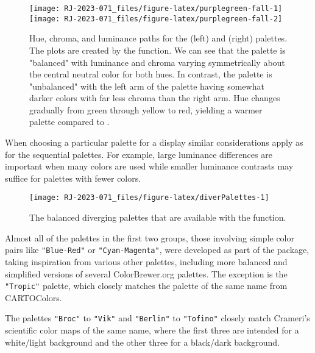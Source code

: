 \begin{figure}[ht!]

{\centering \texttt{[image: RJ-2023-071\_files/figure-latex/purplegreen-fall-1]} \texttt{[image: RJ-2023-071\_files/figure-latex/purplegreen-fall-2]} 

}

\caption{Hue, chroma, and luminance paths for the  (left) and  (right) palettes. The plots are created by the  function. We can see that the  palette is "balanced" with luminance and chroma varying symmetrically about the central neutral color for both hues. In contrast, the  palette is "unbalanced" with the left arm of the palette having somewhat darker colors with far less chroma than the right arm. Hue changes gradually from green through yellow to red, yielding a warmer palette compared to .}\label{fig:purplegreen-fall}
\end{figure}

When choosing a particular palette for a display similar
considerations apply as for the sequential palettes. For example,
large luminance differences are important when many colors are used
while smaller luminance contrasts may suffice for palettes with fewer
colors.

\begin{figure}[ht!]

{\centering \texttt{[image: RJ-2023-071\_files/figure-latex/diverPalettes-1]} 

}

\caption{The balanced diverging palettes that are available with the  function.}\label{fig:diverPalettes}
\end{figure}

Almost all of the palettes in the first two groups, those
involving simple color pairs like
\texttt{"Blue-Red"} or \texttt{"Cyan-Magenta"}, were developed as part of the
 package, taking inspiration
from various other palettes, including more balanced and simplified
versions of several ColorBrewer.org palettes.
The exception is the \texttt{"Tropic"} palette,
which closely matches the palette of the same name from CARTOColors.

The palettes \texttt{"Broc"} to \texttt{"Vik"} and \texttt{"Berlin"} to \texttt{"Tofino"} closely
match Crameri's scientific color maps of the same name,
where the first three are intended for a white/light background and
the other three for a black/dark background.

